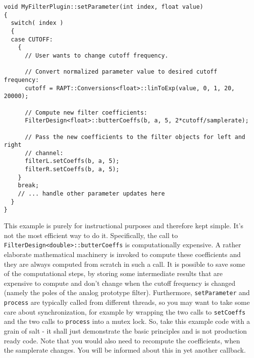 \begin{lstlisting}
void MyFilterPlugin::setParameter(int index, float value)
{
  switch( index )
  {
  case CUTOFF:
    {
      // User wants to change cutoff frequency. 

      // Convert normalized parameter value to desired cutoff frequency:
      cutoff = RAPT::Conversions<float>::linToExp(value, 0, 1, 20, 20000);

      // Compute new filter coefficients:
      FilterDesign<float>::butterCoeffs(b, a, 5, 2*cutoff/samplerate);

      // Pass the new coefficients to the filter objects for left and right
      // channel:
      filterL.setCoeffs(b, a, 5);
      filterR.setCoeffs(b, a, 5);
    }
    break;
    // ... handle other parameter updates here	
  }
}
\end{lstlisting}
This example is purely for instructional purposes and therefore kept simple. It's not the most efficient way to do it. Specifically, the call to \texttt{FilterDesign<double>::butterCoeffs} is computationally expensive. A rather elaborate mathematical machinery is invoked to compute these coefficients and they are always computed from scratch in such a call. It is possible to save some of the computational steps, by storing some intermediate results that are expensive to compute and don't change when the cutoff frequency is changed (namely the poles of the analog prototype filter). Furthermore, \texttt{setParameter} and \texttt{process} are typically called from different threads, so you may want to take some care about synchronization, for example by wrapping the two calls to \texttt{setCoeffs} and the two calls to \texttt{process} into a mutex lock. So, take this example code with a grain of salt - it shall just demonstrate the basic principles and is not production ready code. Note that you would also need to recompute the coefficients, when the samplerate changes. You will be informed about this in yet another callback.


